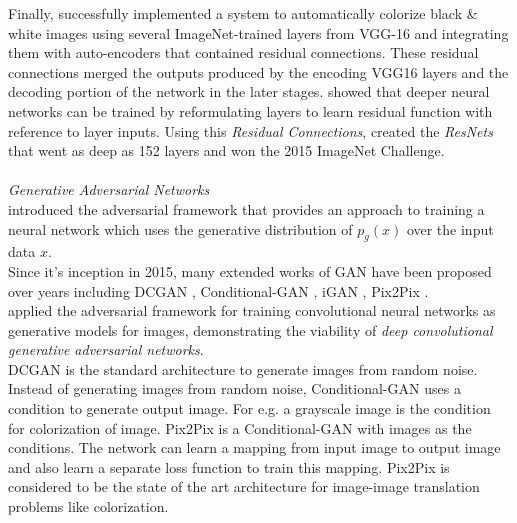 \documentclass[conference]{IEEEtran}
\begin{document}
\hspace*{0.25 in}Finally, \cite{dahl2016automatic} successfully implemented a system to automatically colorize black \& white images using several ImageNet-trained layers from VGG-16 \citep{simonyan2015deep} and integrating them with auto-encoders that contained residual connections. These residual connections merged the outputs produced by the encoding VGG16 layers and the decoding portion of the network in the later stages. \cite{he2015deep} showed that deeper neural networks can be trained by reformulating layers to learn residual function with reference to layer inputs. Using this \textit{Residual Connections}, \cite{he2015deep} created the \textit{ResNets} that went as deep as 152 layers and won the 2015 ImageNet Challenge.\\ \\
\hspace*{0.1 in}\textit{Generative Adversarial Networks}\\
\hspace*{0.25 in}\cite{goodfellow2014generative} introduced the adversarial framework that provides an approach to training a neural network which uses the generative distribution of $p_g(x)$ over the input data $x$.\\
\hspace*{0.25 in}Since it's inception in 2015, many extended works of GAN have been proposed over years including DCGAN \citep{radford2016unsupervised}, Conditional-GAN \citep{mirza2014conditional}, iGAN \citep{zhu2018generative}, Pix2Pix \citep{isola2018imagetoimage}.\\
\hspace*{0.25 in}\cite{radford2016unsupervised} applied the adversarial framework for training convolutional neural networks as generative models for images, demonstrating the viability of \textit{deep convolutional generative adversarial networks}.\\
\hspace*{0.25 in}DCGAN is the standard architecture to generate images from random noise. Instead of generating images from random noise, Conditional-GAN \citep{mirza2014conditional} uses a condition to generate output image. For e.g. a grayscale image is the condition for colorization of image. Pix2Pix \citep{isola2018imagetoimage} is a Conditional-GAN with images as the conditions. The network can learn a mapping from input image to output image and also learn a separate loss function to train this mapping. Pix2Pix is considered to be the state of the art architecture for image-image translation problems like colorization.
\end{document}
